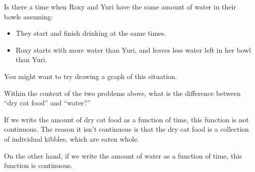 \documentclass{ximera}
\begin{document}
\begin{problem}
  Is there a time when Roxy and Yuri have the same amount of water in
  their bowls assuming:
  \begin{itemize}
  \item They start and finish drinking at the same times.
  \item Roxy starts with more water than Yuri, and leaves less water
    left in her bowl than Yuri.
  \end{itemize}
    \begin{hint}
  	You might want to try drawing a graph of this situation.
  \end{hint}
    \begin{multipleChoice}
  \end{multipleChoice}
\end{problem}



\begin{problem}
  Within the context of the two problems above, what is the difference
  between ``dry cat food'' and ``water?''
  \begin{freeResponse}
    If we write the amount of dry cat food as a function of time, this function
    is not continuous.  The reason it isn't continuous is that the dry cat food
    is a collection of individual kibbles, which are eaten whole.
    
    On the other hand, if we write the amount of water as a function of time, 
    this function is continuous.
  \end{freeResponse}
\end{problem}


\end{document}

